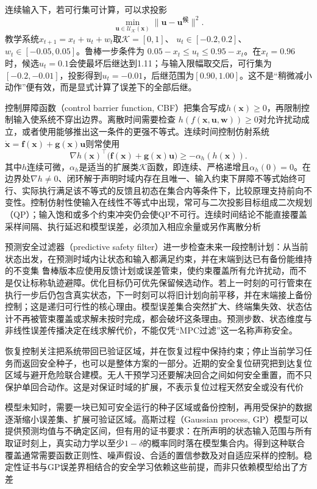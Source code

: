 连续输入下，若可行集可计算，可以求投影
\[
  \min_{\bm{u}\in\mathcal U_{\mathcal K}(\bm{x})}
          \|\bm{u}-\bm{u}^{\text{候}}\|^2.
\]
教学系统$x_{t+1}=x_t+u_t+w_t$取$\mathcal K=[0,1]$、
$u_t\in[-0.2,0.2]$、$w_t\in[-0.05,0.05]$。鲁棒一步条件为
$0.05-x_t\leq u_t\leq0.95-x_t$。在$x_t=0.96$时，候选$u_t=0.1$会使最坏后继达到1.11；与输入限幅取交后，可行集为$[-0.2,-0.01]$，投影得到$u_t=-0.01$，后继范围为$[0.90,1.00]$。这不是“稍微减小动作”便有效，而是显式计算了误差下的全部后继。

控制屏障函数（control barrier function, CBF）把集合写成$h(\bm{x})\geq0$，再限制控制输入使系统不穿出边界。离散时间需要检查
$h(f(\bm{x},\bm{u},\bm{w}))\geq0$对允许扰动成立，或者使用能够推出这一条件的更强不等式。连续时间控制仿射系统
$\dot{\bm{x}}=\bm{f}(\bm{x})+\bm{g}(\bm{x})\bm{u}$则常使用
\[
  \nabla h(\bm{x})^\top
       \bigl(\bm{f}(\bm{x})+\bm{g}(\bm{x})\bm{u}\bigr)
        \geq-\alpha_h(h(\bm{x})).
\]
其中$h$连续可微，$\alpha_h$是适当的扩展类$\mathcal K$函数，即连续、严格递增且$\alpha_h(0)=0$。在边界处$\nabla h\neq0$、闭环解于声明时域内存在且唯一、输入约束下屏障不等式始终可行、实际执行满足该不等式的反馈且初态在集合内等条件下，比较原理支持前向不变性。控制仿射性使输入在线性不等式中出现，常可与二次投影目标组成二次规划（QP）；输入饱和或多个约束冲突仍会使QP不可行。连续时间结论不能直接覆盖采样间隔、执行延迟和模型误差，必须加入相应余量或另作离散分析

预测安全过滤器（predictive safety filter）进一步检查未来一段控制计划：从当前状态出发，在预测时域内让状态和输入都满足约束，并在末端到达已有备份能维持的不变集
鲁棒版本应使用反馈计划或误差管束，使约束覆盖所有允许扰动，而不是仅让标称轨迹避障。优化目标仍可优先保留候选动作。若上一时刻的可行管束在执行一步后仍包含真实状态，下一时刻可以将旧计划向前平移，并在末端接上备份控制；这是递归可行性的核心理由。模型误差集合突然扩大、终端集失效、状态估计不再被管束覆盖或求解未按时完成，都会破坏这条理由。预测步数、状态维度与非线性误差传播决定在线求解代价，不能仅凭“MPC过滤”这一名称声称安全。

恢复控制关注把系统带回已验证区域，并在恢复过程中保持约束；停止当前学习任务而返回安全种子，也可以是整体方案的一部分。近期的安全复位研究把到达复位区域与避开危险联合建模。无人干预学习还要解决回合之间如何安全重置，而不只保护单回合动作。这是对保证时域的扩展，不表示复位过程天然安全或没有代价

模型未知时，需要一块已知可安全运行的种子区域或备份控制，再用受保护的数据逐渐缩小误差集、扩展可验证区域。高斯过程（Gaussian process, GP）模型可以提供预测均值与不确定区间，但有用的证书要求：在所声明的状态输入范围与所有取证时刻上，真实动力学以至少$1-\delta$的概率同时落在模型集合内。得到这种联合覆盖通常需要函数正则性、噪声假设、合适的置信参数及对自适应采样的控制。稳定性证书与GP误差界相结合的安全学习依赖这些前提，而非只依赖模型给出了方差

